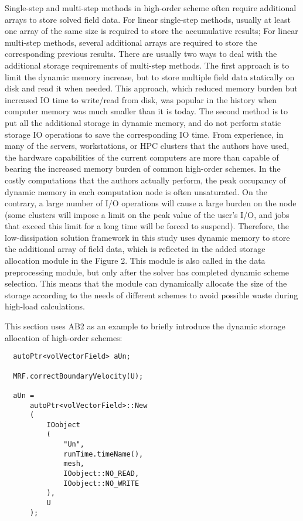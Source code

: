 \documentclass{article}
\begin{document}
Single-step and multi-step methods in high-order scheme often require additional arrays to store solved field data. For linear single-step methods, usually at least one array of the same size is required to store the accumulative results; For linear multi-step methods, several additional arrays are required to store the corresponding previous results. There are usually two ways to deal with the additional storage requirements of multi-step methods. The first approach is to limit the dynamic memory increase, but to store multiple field data statically on disk and read it when needed. This approach, which reduced memory burden but increased IO time to write/read from disk, was popular in the history when computer memory was much smaller than it is today. The second method is to put all the additional storage in dynamic memory, and do not perform static storage IO operations to save the corresponding IO time. From experience, in many of the servers, workstations, or HPC clusters that the authors have used, the hardware capabilities of the current computers are more than capable of bearing the increased memory burden of common high-order schemes. In the costly computations that the authors actually perform, the peak occupancy of dynamic memory in each computation node is often unsaturated. On the contrary, a large number of I/O operations will cause a large burden on the node (some clusters will impose a limit on the peak value of the user's I/O, and jobs that exceed this limit for a long time will be forced to suspend). Therefore, the low-dissipation solution framework in this study uses dynamic memory to store the additional array of field data, which is reflected in the added storage allocation module in the Figure 2. This module is also called in the data preprocessing module, but only after the solver has completed dynamic scheme selection. This means that the module can dynamically allocate the size of the storage according to the needs of different schemes to avoid possible waste during high-load calculations.

This section uses AB2 as an example to briefly introduce the dynamic storage allocation of high-order schemes:

\begin{lstlisting}
  autoPtr<volVectorField> aUn;

  MRF.correctBoundaryVelocity(U);

  aUn =
      autoPtr<volVectorField>::New
      (
          IOobject
          (
              "Un",
              runTime.timeName(),
              mesh,
              IOobject::NO_READ,
              IOobject::NO_WRITE
          ),
          U
      );
\end{lstlisting}
\end{document}

